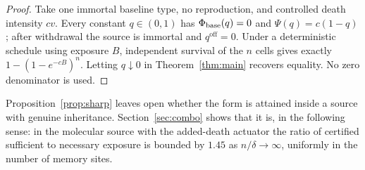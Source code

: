 \begin{proof}
Take one immortal baseline type, no reproduction, and controlled death intensity
$cv$. Every constant $q\in(0,1)$ has $\Phi_{\mathrm{base}}(q)=0$ and $\Psi(q)=c(1-q)$; after
withdrawal the source is immortal and $q^{\mathrm{off}}=0$. Under a
deterministic schedule using exposure $B$, independent survival of the $n$ cells
gives exactly $1-(1-e^{-cB})^n$. Letting $q\downarrow0$ in
Theorem~\ref{thm:main} recovers equality. No zero denominator is used.
\end{proof}

Proposition~\ref{prop:sharp} leaves open whether the form is attained inside a
source with genuine inheritance. Section~\ref{sec:combo} shows that it is, in
the following sense: in the molecular source with the added-death actuator the
ratio of certified sufficient to necessary exposure is bounded by $1.45$ as
$n/\delta\to\infty$, uniformly in the number of memory sites.
